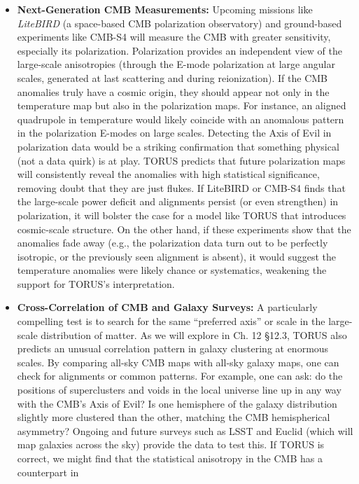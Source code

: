 \documentclass[
]{article}
\begin{document}
\begin{itemize}
\item
  \textbf{Next-Generation CMB Measurements:} Upcoming missions like
  \emph{LiteBIRD} (a space-based CMB polarization observatory) and
  ground-based experiments like CMB-S4 will measure the CMB with greater
  sensitivity, especially its polarization. Polarization provides an
  independent view of the large-scale anisotropies (through the E-mode
  polarization at large angular scales, generated at last scattering and
  during reionization). If the CMB anomalies truly have a cosmic origin,
  they should appear not only in the temperature map but also in the
  polarization maps. For instance, an aligned quadrupole in temperature
  would likely coincide with an anomalous pattern in the polarization
  E-modes on large scales. Detecting the Axis of Evil in polarization
  data would be a striking confirmation that something physical (not a
  data quirk) is at play. TORUS predicts that future polarization maps
  will consistently reveal the anomalies with high statistical
  significance, removing doubt that they are just flukes. If LiteBIRD or
  CMB-S4 finds that the large-scale power deficit and alignments persist
  (or even strengthen) in polarization, it will bolster the case for a
  model like TORUS that introduces cosmic-scale structure. On the other
  hand, if these experiments show that the anomalies fade away (e.g.,
  the polarization data turn out to be perfectly isotropic, or the
  previously seen alignment is absent), it would suggest the temperature
  anomalies were likely chance or systematics, weakening the support for
  TORUS's interpretation.
\item
  \textbf{Cross-Correlation of CMB and Galaxy Surveys:} A particularly
  compelling test is to search for the same ``preferred axis'' or scale
  in the large-scale distribution of matter. As we will explore in Ch.
  12 §12.3, TORUS also predicts an unusual correlation pattern in galaxy
  clustering at enormous scales. By comparing all-sky CMB maps with
  all-sky galaxy maps, one can check for alignments or common patterns.
  For example, one can ask: do the positions of superclusters and voids
  in the local universe line up in any way with the CMB's Axis of Evil?
  Is one hemisphere of the galaxy distribution slightly more clustered
  than the other, matching the CMB hemispherical asymmetry? Ongoing and
  future surveys such as LSST and Euclid (which will map galaxies across
  the sky) provide the data to test this. If TORUS is correct, we might
  find that the statistical anisotropy in the CMB has a counterpart in

\end{itemize}
\end{document}
